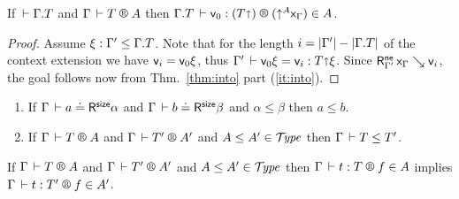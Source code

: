 \documentclass[acmlarge,review,anonymous]{acmart}\settopmatter{printfolios=true}
\newcommand{\LONGVERSION}[1]{}
\begin{document}
\LONGVERSION{
\begin{corollary}[One-to-one]
\label{cor:oneone}
\bla
\begin{enumerate}
\item
If\/ $\LRSize \Gamma a \alpha$ and $\LRSize \Gamma {a'} \alpha$ then $a = a'$.
\item
If\/ $\LRT \Gamma T A \ell$ and $\LRT \Gamma {T'} A {\ell'}$ then $\Gamma \der T = T'$.
\end{enumerate}
\end{corollary}
} %
\begin{corollary}
  \label{cor:fresh}
  If\/ $\,\vdash \Gamma. T$ and %
  $\RG \Gamma T A$
  then $\LR {\cext \Gamma T} {\ind 0} {(T \slift)} {(\up A \var\Gamma)} A$.
\end{corollary}
\begin{proof}
  Assume $\xi : \Gamma' \leq \Gamma. T$.
  Note that for the length
  $i = |\Gamma'| - |\Gamma. T|$ of the context extension
  we have $\mathsf{v}_{i} = \mathsf{v}_{0} \xi$, thus
  $\Gamma' \,\vdash \mathsf{v}_{0} \xi = \mathsf{v}_{i} : T \mathord{\shortuparrow} \xi$.
  Since $\mathsf{R}^{\mathsf{ne}}_{\Gamma'} \, \mathsf{x}_{\Gamma} \searrow \mathsf{v}_{i}$,
  the goal follows now from Thm.~\ref{thm:into} part (\ref{it:into}).
\end{proof}


\begin{lemma}
\label{lem:lrsub}
\bla
\begin{enumerate}
\item
   If\/ $\LRSize \Gamma a \alpha$ and $\Gamma \,\vdash b \doteq \mathsf{R}^{\mathsf{size}} \beta$ and $\alpha \leq \beta$ then $a \leq b$.
\item
   If\/ $\RG \Gamma T A$ and $\RG \Gamma {T'} {A'}$ and $A \leq A' \in \mathcal{T}\!\mathit{ype}$ then $\Gamma \,\vdash T \leq T'$.
\end{enumerate}
\end{lemma}
\LONGVERSION{
\begin{proof}
  The proof is analogous to the one  for algorithmic subtyping to come (Lemma~\ref{lem:lrasub}).
\end{proof}
}

\begin{lemma}
\label{lem:lrsump}
   If\/ $\RG \Gamma T A$ and $\RG \Gamma {T'} {A'}$ and $A \leq A' \in \mathcal{T}\!\mathit{ype}$ then
   $\LR \Gamma t T f A$ implies $\LR \Gamma t {T'} f {A'}$.
\end{lemma}
\end{document}
